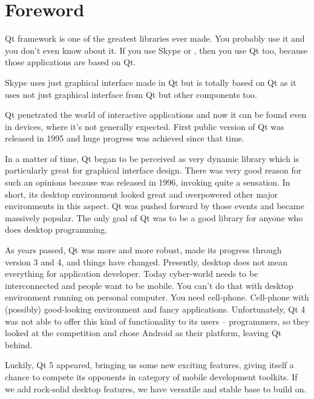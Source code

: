 \chapter{Foreword}
Qt framework \citep{various:qthome} is one of the greatest libraries ever made. You probably use it and you don't even know about it. If you use Skype \citep{various:skype} or  \citep{various:kde}, then you use Qt too, because those applications are based on Qt.

Skype uses just graphical interface made in Qt but  is totally based on Qt as it uses not just graphical interface from Qt but other components too.

Qt penetrated the world of interactive applications and now it can be found even in devices, where it's not generally expected. First public version of Qt was released in 1995 and huge progress was achieved since that time.

In a matter of time, Qt began to be perceived as very dynamic library which is particularly great for graphical interface design. There was very good reason for such an opinions because  was released in 1996, invoking quite a sensation. In short, its desktop environment looked great and overpowered other major environments in this aspect. Qt was pushed forward by those events and became massively popular. The only goal of Qt was to be a good library for anyone who does desktop programming.

As years passed, Qt was more and more robust,  made its progress through version 3 and 4, and things have changed. Presently, desktop does not mean everything for application developer. Today cyber-world needs to be interconnected and people want to be mobile. You can't do that with desktop environment running on personal computer. You need cell-phone. Cell-phone with (possibly) good-looking environment and fancy applications. Unfortunately, Qt 4 was not able to offer this kind of functionality to its users -- programmers, so they looked at the competition and chose Android as their platform, leaving Qt behind.

Luckily, Qt 5 appeared, bringing us some new exciting features, giving itself a chance to compete its opponents in category of mobile development toolkits. If we add rock-solid desktop features, we have versatile and stable base to build on.

\vfill

